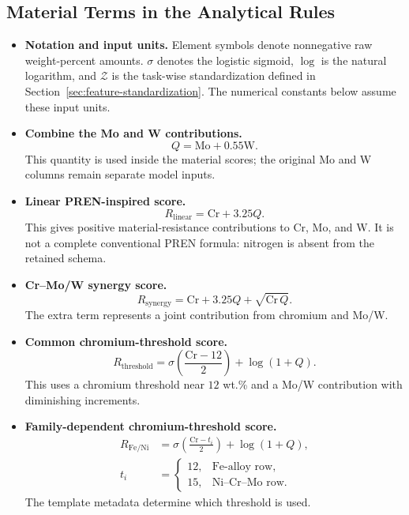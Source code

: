 \documentclass[11pt]{article}
\newenvironment{notes}
  {\begin{itemize}\setlength{\itemsep}{0.45em}\setlength{\parsep}{0pt}}
  {\end{itemize}}
\begin{document}
\subsection{Material Terms in the Analytical Rules}
\label{sec:analytical-material-terms}

\begin{notes}
    \item \textbf{Notation and input units.}
    Element symbols denote nonnegative raw weight-percent
    amounts. \(\sigma\) denotes the logistic sigmoid,
    \(\log\) is the natural logarithm, and \(\mathcal{Z}\)
    is the task-wise standardization defined in
    Section~\ref{sec:feature-standardization}.
    The numerical constants below assume these input units.

    \item \textbf{Combine the Mo and W contributions.}
    \[
        Q=\mathrm{Mo}+0.55\mathrm{W}.
    \]
    This quantity is used inside the material scores; the
    original Mo and W columns remain separate model inputs.

    \item \textbf{Linear PREN-inspired score.}
    \[
        R_{\mathrm{linear}}=\mathrm{Cr}+3.25Q.
    \]
    This gives positive material-resistance contributions to
    Cr, Mo, and W. It is not a complete conventional PREN
    formula: nitrogen is absent from the retained schema.

    \item \textbf{Cr--Mo/W synergy score.}
    \[
        R_{\mathrm{synergy}}
        =\mathrm{Cr}+3.25Q+\sqrt{\mathrm{Cr}\,Q}.
    \]
    The extra term represents a joint contribution from
    chromium and Mo/W.

    \item \textbf{Common chromium-threshold score.}
    \[
        R_{\mathrm{threshold}}
        =\sigma\!\left(\frac{\mathrm{Cr}-12}{2}\right)
         +\log(1+Q).
    \]
    This uses a chromium threshold near \(12\) wt.\% and a
    Mo/W contribution with diminishing increments.

    \item \textbf{Family-dependent chromium-threshold score.}
    \[
    \begin{aligned}
        R_{\mathrm{Fe/Ni}}
        &=\sigma\!\left(\frac{\mathrm{Cr}-t_i}{2}\right)
          +\log(1+Q),\\
        t_i&=
        \begin{cases}
            12,&\text{Fe-alloy row},\\
            15,&\text{Ni--Cr--Mo row}.
        \end{cases}
    \end{aligned}
    \]
    The template metadata determine which threshold is used.


\end{notes}
\end{document}
